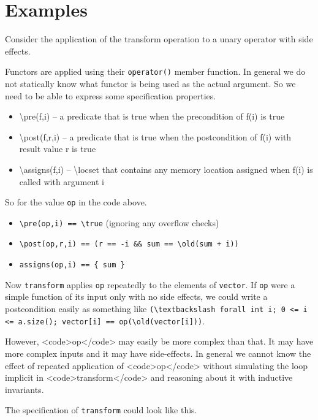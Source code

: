  
\chapter{Examples}

Consider the application of the transform operation to a unary
operator with side effects.



Functors are applied using their \texttt{operator()} member function. 
In general we do not statically know what functor is being used as the actual argument.
So we need to be able to express some specification properties.
\begin{itemize}
\item \textbackslash pre(f,i) -- a predicate that is true when the precondition of f(i) is true
\item \textbackslash post(f,r,i) -- a predicate that is true when the postcondition of f(i) with result value r is true
\item \textbackslash assigns(f,i) -- \textbackslash locset that contains any memory location assigned when f(i) is called with argument i
\end{itemize}
So for the value \texttt{op} in the code above.
\begin{itemize}
	\item \lstinline|\pre(op,i) == \true|  (ignoring any overflow checks)
	\item \lstinline|\post(op,r,i) == (r == -i && sum == \old(sum + i))|
	\item \lstinline|assigns(op,i) == { sum }|
\end{itemize}

Now \lstinline|transform| applies \lstinline|op| repeatedly to the elements of \lstinline|vector|. 
If \lstinline|op| were a simple function of its input only with no side effects, we could write a postcondition easily as something like
\lstinline|(\textbackslash forall int i; 0 <= i <= a.size(); vector[i] == op(\old(vector[i]))|.

However, <code>op</code> may easily be more complex than that. 
It may have more complex inputs and it may have side-effects. 
In general we cannot know the effect of repeated application of <code>op</code> without simulating the loop implicit in <code>transform</code> and reasoning about it with inductive invariants.

The specification of \lstinline|transform| could look like this.


